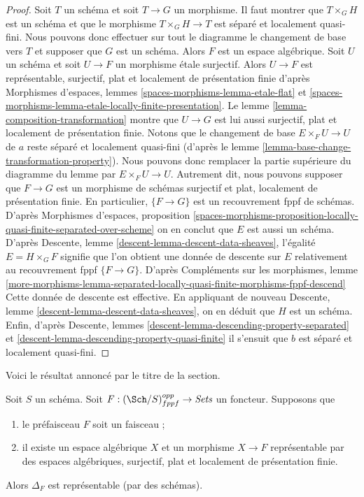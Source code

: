\begin{proof}
Soit $T$ un schéma et soit $T \to G$ un morphisme.
Il faut montrer que $T \times_G H$ est un schéma et que
le morphisme $T \times_G H \to T$ est séparé et
localement quasi-fini. Nous pouvons donc effectuer sur tout le diagramme le changement de base vers $T$
et supposer que $G$ est un schéma. Alors $F$ est un espace algébrique.
Soit $U$ un schéma et soit $U \to F$ un morphisme étale surjectif.
Alors $U \to F$ est représentable, surjectif, plat et
localement de présentation finie d'après
Morphismes d'espaces,
lemmes \ref{spaces-morphisms-lemma-etale-flat} et
\ref{spaces-morphisms-lemma-etale-locally-finite-presentation}.
Le
lemme \ref{lemma-composition-transformation}
montre que $U \to G$ est lui aussi surjectif, plat et localement de présentation finie.
Notons que le changement de base $E \times_F U \to U$ de $a$ reste
séparé et localement quasi-fini (d'après le
lemme \ref{lemma-base-change-transformation-property}). Nous pouvons donc
remplacer la partie supérieure du diagramme du lemme par
$E \times_F U \to U$. Autrement dit, nous pouvons supposer que
$F \to G$ est un morphisme de schémas surjectif et plat,
localement de présentation finie.
En particulier, $\{F \to G\}$ est un recouvrement fppf de schémas.
D'après
Morphismes d'espaces, proposition
\ref{spaces-morphisms-proposition-locally-quasi-finite-separated-over-scheme}
on en conclut que $E$ est aussi un schéma.
D'après
Descente, lemme \ref{descent-lemma-descent-data-sheaves},
l'égalité $E = H \times_G F$ signifie que l'on obtient une donnée de descente
sur $E$ relativement au recouvrement fppf $\{F \to G\}$.
D'après
Compléments sur les morphismes, lemme
\ref{more-morphisms-lemma-separated-locally-quasi-finite-morphisms-fppf-descend}
Cette donnée de descente est effective.
En appliquant de nouveau
Descente, lemme \ref{descent-lemma-descent-data-sheaves},
on en déduit que $H$ est un schéma.
Enfin, d'après
Descente, lemmes \ref{descent-lemma-descending-property-separated} et
\ref{descent-lemma-descending-property-quasi-finite}
il s'ensuit que $b$ est séparé et localement quasi-fini.
\end{proof}

\noindent
Voici le résultat annoncé par le titre de la section.

\begin{lemma}
\label{lemma-bootstrap-diagonal}
Soit $S$ un schéma.
Soit $F : (\Sch/S)_{fppf}^{opp} \to \textit{Sets}$ un foncteur.
Supposons que
\begin{enumerate}
\item le préfaisceau $F$ soit un faisceau ;
\item il existe un espace algébrique $X$ et un morphisme $X \to F$
représentable par des espaces algébriques, surjectif, plat et
localement de présentation finie.
\end{enumerate}
Alors $\Delta_F$ est représentable (par des schémas).
\end{lemma}

